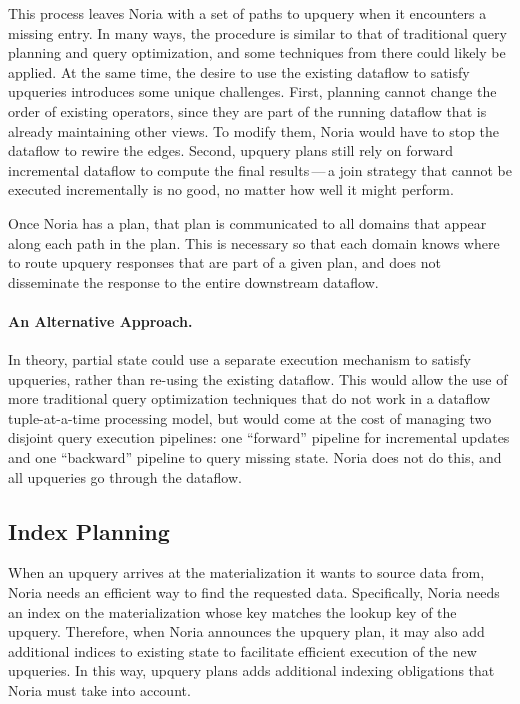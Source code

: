 This process leaves Noria with a set of paths to upquery when it encounters a
missing entry. In many ways, the procedure is similar to that of traditional
query planning and query optimization, and some techniques from there could
likely be applied. At the same time, the desire to use the existing dataflow to
satisfy upqueries introduces some unique challenges. First, planning cannot
change the order of existing operators, since they are part of the running
dataflow that is already maintaining other views. To modify them, Noria would
have to stop the dataflow to rewire the edges. Second, upquery plans still rely
on forward incremental dataflow to compute the final results\,---\,a join
strategy that cannot be executed incrementally is no good, no matter how well it
might perform.

Once Noria has a plan, that plan is communicated to all domains that appear
along each path in the plan. This is necessary so that each domain knows where
to route upquery responses that are part of a given plan, and does not
disseminate the response to the entire downstream dataflow.

\paragraph{An Alternative Approach.}
In theory, partial state could use a separate execution mechanism to satisfy
upqueries, rather than re-using the existing dataflow. This would allow the use
of more traditional query optimization techniques that do not work in a dataflow
tuple-at-a-time processing model, but would come at the cost of managing two
disjoint query execution pipelines: one ``forward'' pipeline for incremental
updates and one ``backward'' pipeline to query missing state. Noria does not do
this, and all upqueries go through the dataflow.

\subsection{Index Planning}

When an upquery arrives at the materialization it wants to source data from,
Noria needs an efficient way to find the requested data. Specifically, Noria
needs an index on the materialization whose key matches the lookup key of the
upquery. Therefore, when Noria announces the upquery plan, it may also add
additional indices to existing state to facilitate efficient execution of the
new upqueries. In this way, upquery plans adds additional indexing obligations
that Noria must take into account.

